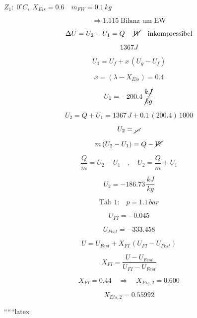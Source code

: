 $Z_1: \; 0^\circ C, \; X_{Eis} = 0.6 \quad m_{FW} = 0.1 \, kg$

\[
\Rightarrow 1.115 \; \text{Bilanz um EW}
\]

\[
\Delta U = U_2 - U_1 = Q - \cancel{W} \quad \text{inkompressibel}
\]

\[
1367 J
\]

\[
U_1 = U_f + x \, (U_g - U_f)
\]

\[
x = (\lambda - X_{Eis}) = 0.4
\]

\[
U_1 = -200.4 \, \cancel{\frac{kJ}{kg}}
\]

\[
U_2 = Q + U_1 = 1367 \, J + 0.1 \, (200.4) \, 1000
\]

\[
U_2 = \cancel{\text{...}}
\]

\[
m \, (U_2 - U_1) = Q - \cancel{W}
\]

\[
\frac{Q}{m} = U_2 - U_1 \quad , \quad U_2 = \frac{Q}{m} + U_1
\]

\[
U_2 = -186.73 \, \frac{kJ}{kg}
\]

\[
\text{Tab 1:} \quad p = 1.1 \, bar
\]

\[
U_{FI} = -0.045
\]

\[
U_{Fest} = -333.458
\]

\[
U = U_{Fest} + X_{FI} \, (U_{FI} - U_{Fest})
\]

\[
X_{FI} = \frac{U - U_{Fest}}{U_{FI} - U_{Fest}}
\]

\[
X_{FI} = 0.44 \quad \Rightarrow \quad X_{Eis,2} = 0.600
\]

\[
X_{Eis,2} = 0.55992
\]

``````latex